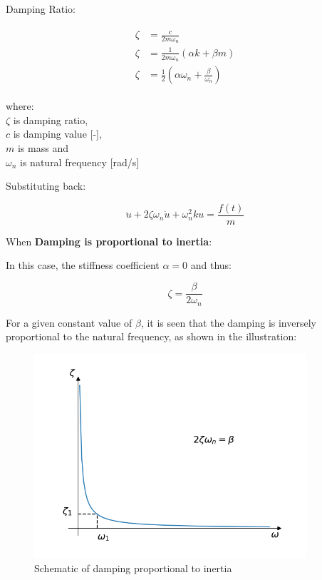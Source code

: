 \documentclass[10pt,b5paper,titlepage]{book}
\newenvironment{eqarray}
{
    \begin{eqnarray}
        \begin{aligned}
}
{
        \end{aligned}
    \end{eqnarray}
}
\begin{document}
Damping Ratio:

\begin{eqarray}
    \zeta &= \frac{c}{2 m \omega_n}\\
    \zeta &= \frac{1}{2 m \omega_n} \left( \alpha k + \beta m \right)\\
    \zeta &= \frac{1}{2} \left( \alpha \omega_n + \frac{\beta}{\omega_n} \right)
\end{eqarray}

where:\\
$ \zeta $ is damping ratio,\\
$ c $ is damping value [-],\\
$ m $ is mass and\\
$ \omega_n $ is natural frequency [rad/s]

Substituting back:

\begin{equation}
    \ddot{u} + 2 \zeta \omega_n \dot{u} + \omega_n^2 k u = \frac{f(t)}{m}
\end{equation}


When \textbf{Damping is proportional to inertia}:

In this case, the stiffness coefficient $ \alpha = 0 $ and thus:

\begin{equation}
    \zeta = \frac{\beta}{2 \omega_n}
\end{equation}

For a given constant value of $ \beta $, it is seen that the damping is inversely
proportional to the natural frequency, as shown in the illustration:

\begin{figure}[ht]
    \centering
    \includegraphics[width=0.90\textwidth]{img/inertia_dependent_damping.png}
    \caption{Schematic of damping proportional to inertia}
    \label{fig:inertia-dependent-damping-png}
\end{figure}
\end{document}
